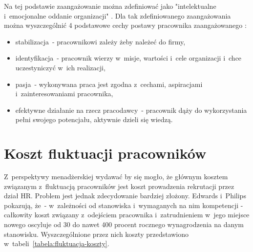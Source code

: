 Na tej podstawie zaangażowanie można zdefiniować jako "intelektualne i~emocjonalne oddanie organizacji" \cite{juchnowicz-2010}.
Dla tak zdefiniowanego zaangażowania można wyszczególnić 4 podstawowe cechy postawy pracownika zaangażowanego \cite{juchnowicz-2010}:
\begin{itemize}
    \item stabilizacja~- pracownikowi zależy żeby należeć do firmy,
    \item identyfikacja~- pracownik wierzy w~misje, wartości i~cele organizacji i~chce uczestyniczyć w~ich realizacji,
    \item pasja~- wykonywana praca jest zgodna z~cechami, aspiracjami i~zainteresowaniami pracownika,
    \item efektywne działanie na rzecz pracodawcy~- pracownik dąży do wykorzystania pełni swojego potencjału, aktywnie dzieli się wiedzą.
\end{itemize}



\section{Koszt fluktuacji pracowników}\label{sec:koszt-fluktuacji}

Z~perspektywy menadżerskiej wydawać by się mogło, że głównym kosztem związanym z~fluktuacją pracowników jest koszt prowadzenia rekrutacji przez dział HR.
Problem jest jednak zdecydowanie bardziej złożony.
Edwards i~Philips \cite{philips-edwards-2009} pokazują, że~- w~zależności od stanowiska i~wymaganych na nim kompetencji -
całkowity koszt związany z~odejściem pracownika i~zatrudnieniem w~jego miejsce nowego oscyluje od 30 do nawet 400 procent
rocznego wynagrodzenia na danym stanowisku. Wyszczególnione przez nich koszty przedstawiono w~tabeli~\ref{tabela:fluktuacja-koszty}.

